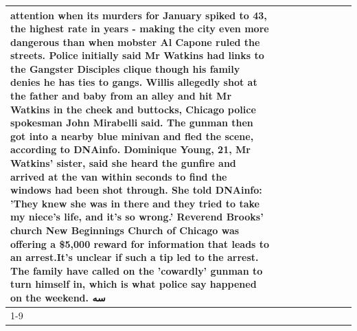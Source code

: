 \begin{table}[H]
\begin{tabular}{lllrlllll}
attention when its murders for January spiked to 43, the highest rate in years - making the city even more dangerous than when mobster Al Capone ruled the streets. Police initially said Mr Watkins had links to the Gangster Disciples clique though his family denies he has ties to gangs. Willis allegedly shot at the father and baby from an alley and hit Mr Watkins in the cheek and buttocks, Chicago police spokesman John Mirabelli said. The gunman then got into a nearby blue minivan and fled the scene, according to DNAinfo. Dominique Young, 21, Mr Watkins' sister, said she heard the gunfire and arrived at the van within seconds to find the windows had been shot through. She told DNAinfo: 'They knew she was in there and they tried to take my niece's life, and it's so wrong.' Reverend Brooks' church New Beginnings Church of Chicago was offering a \$5,000 reward for information that leads to an arrest.It's unclear if such a tip led to the arrest. The family have called on the 'cowardly' gunman to turn himself in, which is what police say happened on the weekend. سه \\
\cline{1-9}

\end{tabular}
\end{table}

